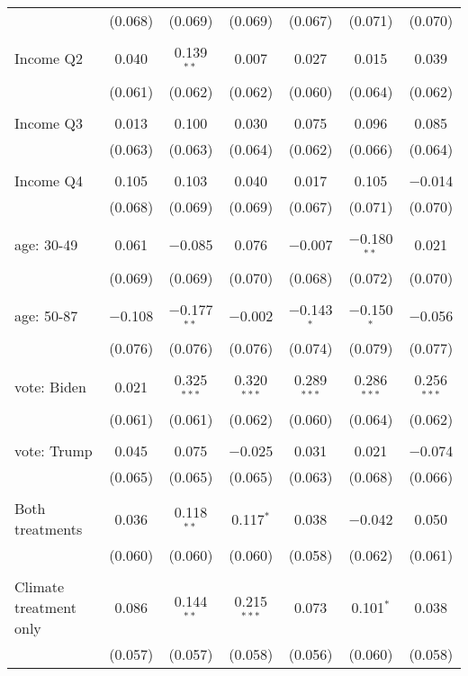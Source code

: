 \begin{tabular}{@{\extracolsep{5pt}}lcccccc}
  & (0.068) & (0.069) & (0.069) & (0.067) & (0.071) & (0.070) \\ 
  & & & & & & \\ 
 Income Q2 & 0.040 & 0.139$^{**}$ & 0.007 & 0.027 & 0.015 & 0.039 \\ 
  & (0.061) & (0.062) & (0.062) & (0.060) & (0.064) & (0.062) \\ 
  & & & & & & \\ 
 Income Q3 & 0.013 & 0.100 & 0.030 & 0.075 & 0.096 & 0.085 \\ 
  & (0.063) & (0.063) & (0.064) & (0.062) & (0.066) & (0.064) \\ 
  & & & & & & \\ 
 Income Q4 & 0.105 & 0.103 & 0.040 & 0.017 & 0.105 & $-$0.014 \\ 
  & (0.068) & (0.069) & (0.069) & (0.067) & (0.071) & (0.070) \\ 
  & & & & & & \\ 
 age: 30-49 & 0.061 & $-$0.085 & 0.076 & $-$0.007 & $-$0.180$^{**}$ & 0.021 \\ 
  & (0.069) & (0.069) & (0.070) & (0.068) & (0.072) & (0.070) \\ 
  & & & & & & \\ 
 age: 50-87 & $-$0.108 & $-$0.177$^{**}$ & $-$0.002 & $-$0.143$^{*}$ & $-$0.150$^{*}$ & $-$0.056 \\ 
  & (0.076) & (0.076) & (0.076) & (0.074) & (0.079) & (0.077) \\ 
  & & & & & & \\ 
 vote: Biden & 0.021 & 0.325$^{***}$ & 0.320$^{***}$ & 0.289$^{***}$ & 0.286$^{***}$ & 0.256$^{***}$ \\ 
  & (0.061) & (0.061) & (0.062) & (0.060) & (0.064) & (0.062) \\ 
  & & & & & & \\ 
 vote: Trump & 0.045 & 0.075 & $-$0.025 & 0.031 & 0.021 & $-$0.074 \\ 
  & (0.065) & (0.065) & (0.065) & (0.063) & (0.068) & (0.066) \\ 
  & & & & & & \\ 
 Both treatments & 0.036 & 0.118$^{**}$ & 0.117$^{*}$ & 0.038 & $-$0.042 & 0.050 \\ 
  & (0.060) & (0.060) & (0.060) & (0.058) & (0.062) & (0.061) \\ 
  & & & & & & \\ 
 Climate treatment only & 0.086 & 0.144$^{**}$ & 0.215$^{***}$ & 0.073 & 0.101$^{*}$ & 0.038 \\ 
  & (0.057) & (0.057) & (0.058) & (0.056) & (0.060) & (0.058) \\ 

\end{tabular}

